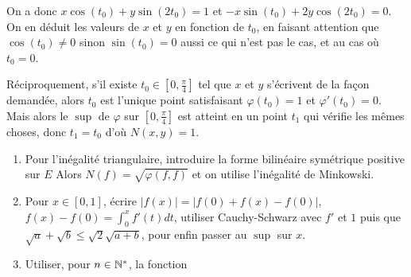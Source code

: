 \begin{solution}
\begin{enumerate}
		On a donc $x\cos(t_{0})+y\sin(2t_{0})=1$ et $-x\sin(t_{0})+2y\cos(2t_{0})=0$. On en déduit les valeurs de $x$ et $y$ en fonction de $t_{0}$, en faisant attention que $\cos(t_{0})\neq0$ sinon $\sin(t_{0})=0$ aussi ce qui n'est pas le cas, et au cas où $t_{0}=0$.

		Réciproquement, s'il existe $t_{0}\in[0,\frac{\pi}{4}]$ tel que $x$ et $y$ s'écrivent de la façon demandée, alors $t_{0}$ est l'unique point satisfaisant $\varphi(t_{0})=1$ et $\varphi'(t_{0})=0$. Mais alors le $\sup$ de $\varphi$ sur $[0,\frac{\pi}{4}]$ est atteint en un point $t_{1}$ qui vérifie les mêmes choses, donc $t_{1}=t_{0}$ d'où $N(x,y)=1$.
	\end{enumerate}
\end{solution}

\begin{solution}
	\phantom{}
	\begin{enumerate}
		\item Pour l'inégalité triangulaire, introduire la forme bilinéaire symétrique positive sur $E$ 
		Alors $N(f)=\sqrt{\varphi(f,f)}$ et on utilise l'inégalité de Minkowski.
		\item Pour $x\in[0,1]$, écrire $\vert f(x)\vert=\vert f(0)+f(x)-f(0)\vert$, $f(x)-f(0)=\int_{0}^{x}f'(t)dt$, utiliser Cauchy-Schwarz avec $f'$ et $1$ puis que $\sqrt{a}+\sqrt{b}\leqslant\sqrt{2}\sqrt{a+b}$, pour enfin passer au $\sup$ sur $x$.
		\item Utiliser, pour $n\in\mathbb{N}^{*}$, la fonction 
	\end{enumerate}
\end{solution}

